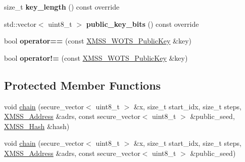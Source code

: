 \begin{DoxyCompactItemize}
size\+\_\+t {\bfseries key\+\_\+length} () const override
\item 
\mbox{\label{class_botan_1_1_x_m_s_s___w_o_t_s___public_key_afcfda216c19466d33fbe2b1b0ac34d53}} 
std\+::vector$<$ uint8\+\_\+t $>$ {\bfseries public\+\_\+key\+\_\+bits} () const override
\item 
\mbox{\label{class_botan_1_1_x_m_s_s___w_o_t_s___public_key_a88be27665e699f4c36f426ac68266295}} 
bool {\bfseries operator==} (const \hyperlink{class_botan_1_1_x_m_s_s___w_o_t_s___public_key}{X\+M\+S\+S\+\_\+\+W\+O\+T\+S\+\_\+\+Public\+Key} \&key)
\item 
\mbox{\label{class_botan_1_1_x_m_s_s___w_o_t_s___public_key_aa8894d1173549b226f16d161540ca9dc}} 
bool {\bfseries operator!=} (const \hyperlink{class_botan_1_1_x_m_s_s___w_o_t_s___public_key}{X\+M\+S\+S\+\_\+\+W\+O\+T\+S\+\_\+\+Public\+Key} \&key)
\end{DoxyCompactItemize}
\subsection*{Protected Member Functions}
\begin{DoxyCompactItemize}
\item 
void \hyperlink{class_botan_1_1_x_m_s_s___w_o_t_s___public_key_ac94af1061b3136b52bacfc200710b809}{chain} (secure\+\_\+vector$<$ uint8\+\_\+t $>$ \&x, size\+\_\+t start\+\_\+idx, size\+\_\+t steps, \hyperlink{class_botan_1_1_x_m_s_s___address}{X\+M\+S\+S\+\_\+\+Address} \&adrs, const secure\+\_\+vector$<$ uint8\+\_\+t $>$ \&public\+\_\+seed, \hyperlink{class_botan_1_1_x_m_s_s___hash}{X\+M\+S\+S\+\_\+\+Hash} \&hash)
\item 
void \hyperlink{class_botan_1_1_x_m_s_s___w_o_t_s___public_key_a769ef5fc521f106287e49c67797d3fc1}{chain} (secure\+\_\+vector$<$ uint8\+\_\+t $>$ \&x, size\+\_\+t start\+\_\+idx, size\+\_\+t steps, \hyperlink{class_botan_1_1_x_m_s_s___address}{X\+M\+S\+S\+\_\+\+Address} \&adrs, const secure\+\_\+vector$<$ uint8\+\_\+t $>$ \&public\+\_\+seed)
\end{DoxyCompactItemize}
